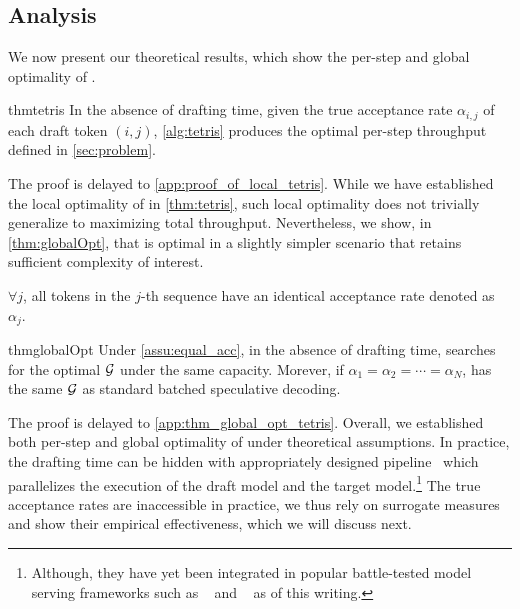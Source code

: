 \subsection{Analysis}\label{sec:analysis}
We now present our theoretical results, which show the per-step and global optimality of \alg{}.

\begin{restatable}{thm}{tetris}
    \label{thm:tetris}
    In the absence of drafting time, given the true acceptance rate $\alpha_{i,j}$ of each draft token $(i, j)$, \cref{alg:tetris} produces the optimal per-step throughput defined in \cref{sec:problem}.
\end{restatable}
The proof is delayed to \cref{app:proof_of_local_tetris}. 
While we have established the local optimality of \alg{} in \cref{thm:tetris}, such local optimality does not trivially generalize to maximizing total throughput. 
Nevertheless, we show, in \cref{thm:globalOpt}, that \alg{} is optimal in a slightly simpler scenario that retains sufficient complexity of interest.

\begin{assu}
    \label{assu:equal_acc}
    $\forall j$, all tokens in the $j$-th sequence have an identical acceptance rate denoted as $\alpha_j$.
\end{assu}

\begin{restatable}{thm}{globalOpt}
    \label{thm:globalOpt}
    Under \cref{assu:equal_acc}, in the absence of drafting time, \alg{} searches for the optimal ${\mathcal{G}}$ under the same capacity. Morever, if $\alpha_1 = \alpha_2 = \cdots = \alpha_N$, \alg{} has the same ${\mathcal{G}}$ as standard batched speculative decoding.
\end{restatable}

The proof is delayed to \cref{app:thm_global_opt_tetris}.
Overall, we established both per-step and global optimality of \alg{} under theoretical assumptions.
In practice, the drafting time can be hidden with appropriately designed pipeline~\citep{liu2024parallelspeculativedecodingadaptive,wang2024minions} which parallelizes the execution of the draft model and the target model.\footnote{Although, they have yet been integrated in popular battle-tested model serving frameworks such as \vllm{}~\citep{kwon2023vllm} and \sglang{}~\citep{zheng2024sglangefficientexecutionstructured} as of this writing.}
The true acceptance rates are inaccessible in practice, we thus rely on surrogate measures and show their empirical effectiveness, which we will discuss next.


